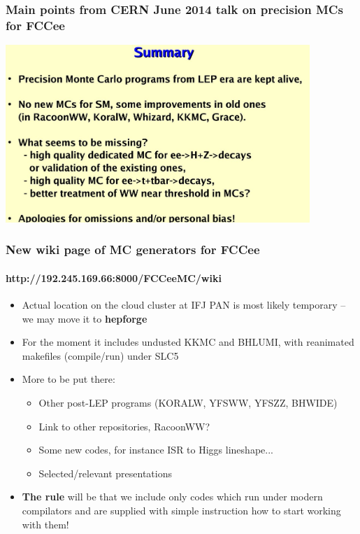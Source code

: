 \documentclass{beamer}
\newcommand{\ns}{\normalsize}
\begin{document}
\begin{frame}[fragile]
\frametitle{\bf\ns 
 Main points from CERN June 2014 talk on precision MCs for FCCee}

\includegraphics[width=115mm]{./sli12.jpg}
\end{frame}



\begin{frame}[fragile]
\frametitle{\bf New wiki page of MC generators for FCCee}
\framesubtitle{\bf http://192.245.169.66:8000/FCCeeMC/wiki}

\begin{itemize}
\item
 Actual location on the cloud cluster at IFJ PAN is most likely
 temporary -- we may move it to {\bf hepforge}
\item
 For the moment it includes undusted KKMC and BHLUMI,
 with reanimated makefiles (compile/run) under SLC5
\item
 More to be put there:
\begin{itemize}
\item Other post-LEP programs (KORALW, YFSWW, YFSZZ, BHWIDE)
\item Link to other repositories, RacoonWW?
\item Some new codes, for instance ISR to Higgs lineshape...
\item Selected/relevant presentations
\end{itemize}
\item 
 {\bf The rule} will be that we include only codes which run
 under modern compilators 
 and are supplied with simple instruction 
 how to start working with them!
\end{itemize}
\end{frame}
\end{document}
